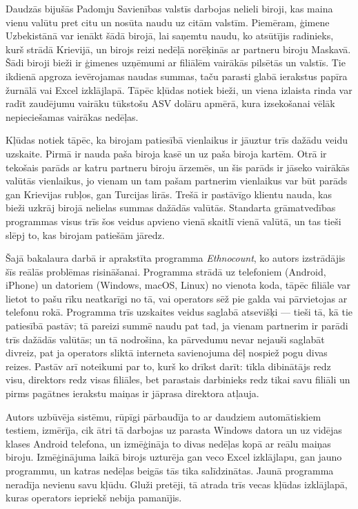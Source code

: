 \frontmatterpage
{}

Daudzās bijušās Padomju Savienības valstīs darbojas nelieli biroji, kas maina vienu valūtu pret citu un nosūta naudu uz citām valstīm. Piemēram, ģimene Uzbekistānā var ienākt šādā birojā, lai saņemtu naudu, ko atsūtījis radinieks, kurš strādā Krievijā, un birojs reizi nedēļā norēķinās ar partneru biroju Maskavā. Šādi biroji bieži ir ģimenes uzņēmumi ar filiālēm vairākās pilsētās un valstīs. Tie ikdienā apgroza ievērojamas naudas summas, taču parasti glabā ierakstus papīra žurnālā vai Excel izklājlapā. Tāpēc kļūdas notiek bieži, un viena izlaista rinda var radīt zaudējumu vairāku tūkstošu ASV dolāru apmērā, kura izsekošanai vēlāk nepieciešamas vairākas nedēļas.

Kļūdas notiek tāpēc, ka birojam patiesībā vienlaikus ir jāuztur trīs dažādu veidu uzskaite. Pirmā ir nauda paša biroja kasē un uz paša biroja kartēm. Otrā ir tekošais parāds ar katru partneru biroju ārzemēs, un šis parāds ir jāseko vairākās valūtās vienlaikus, jo vienam un tam pašam partnerim vienlaikus var būt parāds gan Krievijas rubļos, gan Turcijas lirās. Trešā ir pastāvīgo klientu nauda, kas bieži uzkrāj birojā nelielas summas dažādās valūtās. Standarta grāmatvedības programmas visus trīs šos veidus apvieno vienā skaitlī vienā valūtā, un tas tieši slēpj to, kas birojam patiešām jāredz.

Šajā bakalaura darbā ir aprakstīta programma \emph{Ethnocount}, ko autors izstrādājis šīs reālās problēmas risināšanai. Programma strādā uz telefoniem (Android, iPhone) un datoriem (Windows, macOS, Linux) no vienota koda, tāpēc filiāle var lietot to pašu rīku neatkarīgi no tā, vai operators sēž pie galda vai pārvietojas ar telefonu rokā. Programma trīs uzskaites veidus saglabā atsevišķi --- tieši tā, kā tie patiesībā pastāv; tā pareizi summē naudu pat tad, ja vienam partnerim ir parādi trīs dažādās valūtās; un tā nodrošina, ka pārvedumu nevar nejauši saglabāt divreiz, pat ja operators sliktā interneta savienojuma dēļ nospiež pogu divas reizes. Pastāv arī noteikumi par to, kurš ko drīkst darīt: tīkla dibinātājs redz visu, direktors redz visas filiāles, bet parastais darbinieks redz tikai savu filiāli un pirms pagātnes ierakstu maiņas ir jāprasa direktora atļauja.

Autors uzbūvēja sistēmu, rūpīgi pārbaudīja to ar daudziem automātiskiem testiem, izmērīja, cik ātri tā darbojas uz parasta Windows datora un uz vidējas klases Android telefona, un izmēģināja to divas nedēļas kopā ar reālu maiņas biroju. Izmēģinājuma laikā birojs uzturēja gan veco Excel izklājlapu, gan jauno programmu, un katras nedēļas beigās tās tika salīdzinātas. Jaunā programma neradīja nevienu savu kļūdu. Gluži pretēji, tā atrada trīs vecas kļūdas izklājlapā, kuras operators iepriekš nebija pamanījis.

